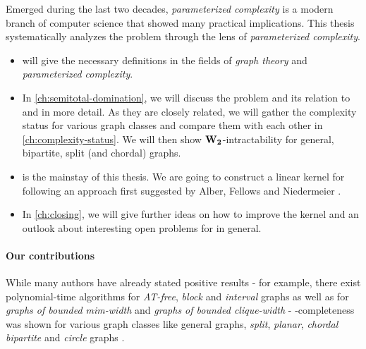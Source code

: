 Emerged during the last two decades, \textit{parameterized complexity} is a modern branch of computer science that showed many practical implications. 
This thesis systematically analyzes the \sdom problem through the lens of \textit{parameterized complexity}. 

\begin{itemize}
    \item {} will give the necessary definitions in the fields of \textit{graph theory} and \textit{parameterized complexity}.
    \item In \cref{ch:semitotal-domination}, we will discuss the \sdom problem and its relation to \dom and \tdom in more detail. 
    As they are closely related, we will gather the complexity status for various graph classes and compare them with each other in \cref{ch:complexity-status}. 
    We will then show $\mathbf{W_2}$-intractability for general, bipartite, split (and chordal) graphs.
    \item {} is the mainstay of this thesis. 
    We are going to construct a linear kernel for \psdom following an approach first suggested by Alber, Fellows and Niedermeier \cite{Alber2004}. 
    \item In \cref{ch:closing}, we will give further ideas on how to improve the kernel and an outlook about interesting open problems for \sdom in general.
\end{itemize}

\paragraph{Our contributions}

While many authors have already stated positive results - for example, there exist polynomial-time algorithms for \emph{AT-free}, \emph{block} and \emph{interval} graphs as well as for \emph{graphs of bounded mim-width} and \emph{graphs of bounded clique-width} \cite{Kloks2021, Galby2020,Courcelle1990,Henning2022,Henning2019} - \NP-completeness was shown for various graph classes like general graphs, \emph{split}, \emph{planar}, \emph{chordal bipartite} and \emph{circle} graphs \cite{Henning2019, Kloks2021}.


